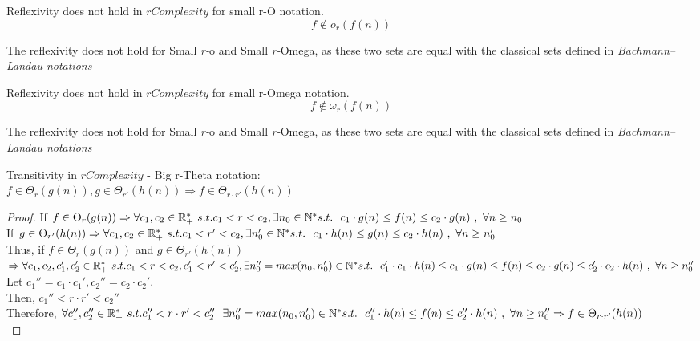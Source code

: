 \begin{remark}
    Reflexivity does not hold in $rComplexity$ for small r-O notation.
    \[ f \notin o_{r}(f(n)) \]

    The reflexivity does not hold for Small \textit{r-}o and Small \textit{r-}Omega, as these two sets are equal with the classical sets defined in \textit{Bachmann–Landau notations}
\end{remark}

\begin{remark}
    Reflexivity does not hold in $rComplexity$ for small r-Omega notation.
    \[ f \notin \omega_{r}(f(n)) \]

    The reflexivity does not hold for Small \textit{r-}o and Small \textit{r-}Omega, as these two sets are equal with the classical sets defined in \textit{Bachmann–Landau notations}
\end{remark}


\begin{theorem}
    Transitivity in $rComplexity$ - Big r-Theta notation:  \\  $ f \in \Theta_{r}(g(n)), g \in \Theta_{r'}(h(n)) \Rightarrow  f \in \Theta_{r \cdot r'}(h(n))$
\end{theorem}
\begin{proof}
    If $ f \in \Theta_{r}(g(n)) \Rightarrow \forall c_{1}, c_{2} \in \mathbb{R}^{*}_{+} \ s.t. c_{1}< r < c_{2} , \exists n_{0} \in \mathbb{N}^{*}\ \\ s.t.\ \ c_{1} \cdot g(n) \leq f(n) \leq c_{2} \cdot g(n)\ ,\  \forall n \geq n_{0} $ \\
    If $ g \in \Theta_{r'}(h(n)) \Rightarrow \forall c_{1}, c_{2} \in \mathbb{R}^{*}_{+} \ s.t. c_{1} < r' < c_{2} , \exists n_{0}' \in \mathbb{N}^{*}\ \\ s.t.\ \ c_{1} \cdot h(n) \leq g(n) \leq c_{2} \cdot h(n)\ ,\  \forall n \geq n_{0}' $ \\
    Thus, if $ f \in \Theta_{r}(g(n))$ and $ g \in \Theta_{r'}(h(n))$ \\ $\Rightarrow \forall c_{1}, c_{2}, c_{1}', c_{2}' \in \mathbb{R}^{*}_{+} \ s.t. c_{1} < r < c_{2}, c_{1}' < r' < c_{2}' , \exists n''_{0}=max(n_{0}, n'_{0}) \in \mathbb{N}^{*}\ \\ s.t.\ \ c_{1}' \cdot c_{1} \cdot h(n) \leq c_{1} \cdot g(n) \leq f(n) \leq c_{2} \cdot g(n) \leq c_{2}' \cdot c_{2} \cdot h(n)\ ,\  \forall n \geq n''_{0} $ \\
    Let $c_{1}'' = c_{1} \cdot c_{1}' , c_{2}'' = c_{2} \cdot c_{2}'$. \\
    Then, $c_{1}'' < r \cdot r' < c_{2}''$ \\
    Therefore, $\forall c_{1}'', c_{2}'' \in \mathbb{R}^{*}_{+} \ s.t. c_{1}'' < r \cdot r' < c_{2}'' \ \ \exists n''_{0}=max(n_{0}, n'_{0}) \in \mathbb{N}^{*}\ \\ s.t.\ \ c_{1}'' \cdot h(n) \leq f(n) \leq c_{2}'' \cdot h(n)\ ,\  \forall n \geq n''_{0} \Rightarrow f \in \Theta_{r \cdot r'}(h(n))$ \\

\end{proof}

